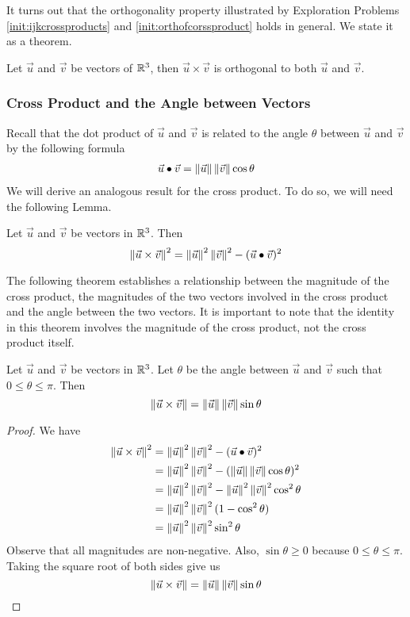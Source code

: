 \documentclass{ximera}
\begin{document}
It turns out that the orthogonality property illustrated by Exploration Problems \ref{init:ijkcrossproducts} and \ref{init:orthofcorssproduct}  holds in general.  We state it as a theorem.
 
\begin{theorem}\label{th:crossproductorthtouandv}
Let $\vec{u}$ and $\vec{v}$ be vectors of $\mathbb{R}^3$, then $\vec{u}\times\vec{v}$ is orthogonal to both $\vec{u}$ and $\vec{v}$.
\end{theorem}

 
\subsubsection*{Cross Product and the Angle between Vectors}
Recall that the dot product of $\vec{u}$ and $\vec{v}$ is related to the angle $\theta$ between $\vec{u}$ and $\vec{v}$ by the following formula
\begin{align}\label{eq:dotproductformula}\vec{u}\bullet\vec{v}=\left\|\vec{u}\right\|\left\|\vec{v}\right\|\cos\theta\end{align}
We will derive an analogous result for the cross product.  To do so, we will need the following Lemma.
 
\begin{lemma}\label{lemma:crossprodmagnitude}
Let $\vec{u}$ and $\vec{v}$ be vectors in $\mathbb{R}^3$.  Then
$$\left\|\vec{u}\times\vec{v}\right\|^2=\left\|\vec{u}\right\|^2\left\|\vec{v}\right\|^2-(\vec{u}\bullet\vec{v})^2$$
\end{lemma}

 
The following theorem establishes a relationship between the magnitude of the cross product, the magnitudes of the two vectors involved in the cross product and the angle between the two vectors.  It is important to note that  the identity in this theorem involves the magnitude of the cross product, not the cross product itself.
 
\begin{theorem}\label{th:crossproductsin}
Let $\vec{u}$ and $\vec{v}$ be vectors in $\mathbb{R}^3$. Let $\theta$ be the angle between $\vec{u}$ and $\vec{v}$ such that $0\leq\theta\leq \pi$. Then
$$\left\|\vec{u}\times\vec{v}\right\|=\left\|\vec{u}\right\|\left\|\vec{v}\right\|\sin\theta$$
\end{theorem}
\begin{proof}
We have
\begin{align*}
\left\|\vec{u}\times\vec{v}\right\|^2&=\left\|\vec{u}\right\|^2\left\|\vec{v}\right\|^2-(\vec{u}\bullet\vec{v})^2\\
&=\left\|\vec{u}\right\|^2\left\|\vec{v}\right\|^2-(\left\|\vec{u}\right\|\left\|\vec{v}\right\|\cos \theta)^2\\
&=\left\|\vec{u}\right\|^2\left\|\vec{v}\right\|^2-\left\|\vec{u}\right\|^2\left\|\vec{v}\right\|^2\cos^2\theta\\
&=\left\|\vec{u}\right\|^2\left\|\vec{v}\right\|^2(1-\cos^2\theta)\\
&=\left\|\vec{u}\right\|^2\left\|\vec{v}\right\|^2\sin^2\theta
\end{align*}
Observe that all magnitudes are non-negative.  Also, $\sin\theta\geq 0$ because $0\leq\theta\leq \pi$.  Taking the square root of both sides give us
$$\left\|\vec{u}\times\vec{v}\right\|=\left\|\vec{u}\right\|\left\|\vec{v}\right\|\sin\theta$$
\end{proof}
 
\end{document}
